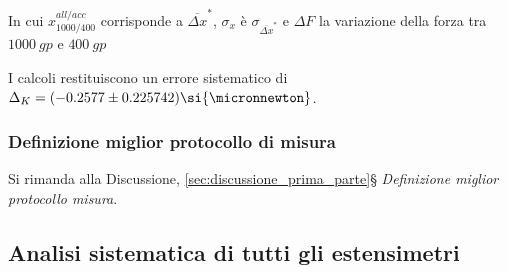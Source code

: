 \documentclass[a4paper,11pt,oneside]{article}
\begin{document}
\\
\\
In cui $x_{1000 / 400}^{all / acc}$ corrisponde a $\overline{\Delta x}^\ast$, $\sigma_{x}$ è $\sigma_{\overline{\Delta x}^\ast}$ e $\Delta F$ la variazione della forza tra $\SI{1000}{gp}$ e $\SI{400}{gp}$

I calcoli restituiscono un errore sistematico di $\Delta_{K} = (-0.2577 \pm 0.225742) \si{\micronnewton}$. 

\subsubsection*{Definizione miglior protocollo di misura}
Si rimanda alla Discussione, \ref{sec:discussione_prima_parte}\S \textit{ Definizione miglior protocollo misura}. 



\subsection{Analisi sistematica di tutti gli estensimetri}
\end{document}
